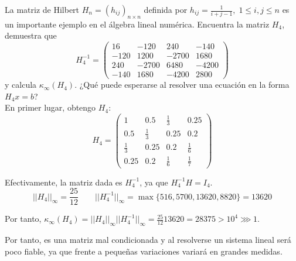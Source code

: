 \begin{ejercicio}
    La matriz de Hilbert $H_n=(h_{ij})_{n\times n}$ definida por $h_{ij}=\frac{1}{i+j-1},\;1\leq i,j\leq n$ es un importante ejemplo en el álgebra lineal numérica. Encuentra la matriz $H_4$, demuestra que
    \begin{equation*}
        H_4^{-1} = \left( \begin{array}{cccc}
            16 & -120 & 240 & -140 \\
            -120 & 1200 & -2700 & 1680 \\
            240 & -2700 & 6480 & -4200 \\
            -140 & 1680 & -4200 & 2800
        \end{array} \right)
    \end{equation*}
    y calcula $\kappa_\infty(H_4)$. ¿Qué puede esperarse al resolver una ecuación en la forma $H_4x=b$?\\

    En primer lugar, obtengo $H_4$:
    \begin{equation*}
        H_4 = \left( \begin{array}{cccc}
            1 & 0.5 & \frac{1}{3} & 0.25 \\
            0.5 & \frac{1}{3} & 0.25 & 0.2 \\
            \frac{1}{3} & 0.25 & 0.2 & \frac{1}{6} \\
            0.25 & 0.2 & \frac{1}{6} & \frac{1}{7}
        \end{array} \right)
    \end{equation*}

    Efectivamente, la matriz dada es $H^{-1}_4$, ya que $H^{-1}_4 H = I_4$.
    \begin{equation*}
        ||H_4||_\infty = \frac{25}{12} \qquad  ||H_4^{-1}||_\infty = \max \{516,5700,13620,8820\} = 13620
    \end{equation*}

    Por tanto, $\kappa_\infty (H_4) = ||H_4||_\infty ||H_4^{-1}||_\infty = \frac{25}{12} 13620 = 28375 > 10^4 \ggg 1$.

    Por tanto, es una matriz mal condicionada y al resolverse un sistema lineal será poco fiable, ya que frente a pequeñas variaciones variará en grandes medidas.
    
\end{ejercicio}

